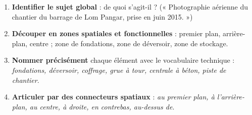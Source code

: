 \documentclass[11pt]{article}
\begin{document}
\begin{methode}
\begin{enumerate}
\item \textbf{Identifier le sujet global} : de quoi s'agit-il ? (« Photographie aérienne du chantier du barrage de Lom Pangar, prise en juin 2015. »)
\item \textbf{Découper en zones spatiales et fonctionnelles} : premier plan, arrière-plan, centre ; zone de fondations, zone de déversoir, zone de stockage.
\item \textbf{Nommer précisément} chaque élément avec le vocabulaire technique : \emph{fondations, déversoir, coffrage, grue à tour, centrale à béton, piste de chantier}.
\item \textbf{Articuler par des connecteurs spatiaux} : \emph{au premier plan, à l'arrière-plan, au centre, à droite, en contrebas, au-dessus de}.
\end{enumerate}
\end{methode}
\end{document}
